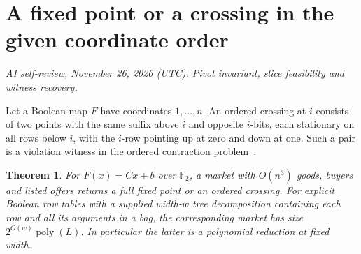 \documentclass[11pt,oneside,openany,notitlepage]{report}
\newtheorem{theorem}{Theorem}[chapter]
\newcommand{\reviewdate}{November 26, 2026 (UTC)}
\newcommand{\reviewmark}[1]{\par\nopagebreak[4]\noindent
  {\footnotesize\itshape AI self-review, \reviewdate. #1\par}\nobreak\smallskip}
\begin{document}
\section{A fixed point or a crossing in the given coordinate order}
\reviewmark{Pivot invariant, slice feasibility and witness recovery.}

Let a Boolean map \(F\) have coordinates \(1,\ldots,n\). An ordered
crossing at \(i\) consists of two points with the same suffix above \(i\)
and opposite \(i\)-bits, each stationary on all rows below \(i\), with
the \(i\)-row pointing up at zero and down at one. Such a pair is a
violation witness in the ordered contraction problem~\cite{fgms}.

\begin{theorem}\label{thm:bool}
For \(F(x)=Cx+b\) over \(\mathbb F_2\), a market with \(O(n^3)\)
goods, buyers and listed offers returns a full fixed point or an ordered
crossing. For explicit Boolean row tables with a supplied width-\(w\)
tree decomposition containing each row and all its arguments in a bag,
the corresponding market has size \(2^{O(w)}\operatorname{poly}(L)\).
In particular the latter is a polynomial reduction at fixed width.
\end{theorem}
\end{document}
